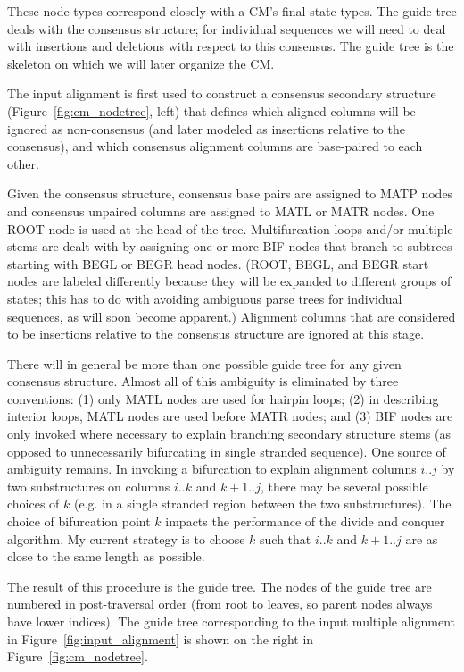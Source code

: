 \documentclass[11pt]{article}
\begin{document}
These node types correspond closely with a CM's final state types.
The guide tree deals with the consensus structure; for individual
sequences we will need to deal with insertions and deletions with
respect to this consensus. The guide tree is the skeleton on which we
will later organize the CM.

The input alignment is first used to construct a consensus secondary
structure (Figure~\ref{fig:cm_nodetree}, left) that defines which
aligned columns will be ignored as non-consensus (and later modeled as
insertions relative to the consensus), and which consensus alignment
columns are base-paired to each other.

Given the consensus structure, consensus base pairs are assigned to
MATP nodes and consensus unpaired columns are assigned to MATL or MATR
nodes. One ROOT node is used at the head of the tree.  Multifurcation
loops and/or multiple stems are dealt with by assigning one or more
BIF nodes that branch to subtrees starting with BEGL or BEGR head
nodes. (ROOT, BEGL, and BEGR start nodes are labeled differently
because they will be expanded to different groups of states; this has
to do with avoiding ambiguous parse trees for individual sequences, as
will soon become apparent.) Alignment columns that are considered to
be insertions relative to the consensus structure are ignored at this
stage.

There will in general be more than one possible guide tree for any
given consensus structure. Almost all of this ambiguity is eliminated
by three conventions: (1) only MATL nodes are used for hairpin loops;
(2) in describing interior loops, MATL nodes are used before MATR
nodes; and (3) BIF nodes are only invoked where necessary to explain
branching secondary structure stems (as opposed to unnecessarily
bifurcating in single stranded sequence). One source of ambiguity
remains. In invoking a bifurcation to explain alignment columns $i..j$
by two substructures on columns $i..k$ and $k+1..j$, there may be
several possible choices of $k$ (e.g. in a single stranded region
between the two substructures). The choice of bifurcation point $k$
impacts the performance of the divide and conquer algorithm.  My
current strategy is to choose $k$ such that $i..k$ and $k+1..j$ are as
close to the same length as possible.

The result of this procedure is the guide tree. The nodes of the guide
tree are numbered in post-traversal order (from root to leaves, so
parent nodes always have lower indices). The guide tree corresponding
to the input multiple alignment in Figure~\ref{fig:input_alignment} is
shown on the right in Figure~\ref{fig:cm_nodetree}.
\end{document}
